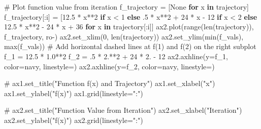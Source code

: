 \documentclass[
  russian,
  letterpaper,
  DIV=11,
  numbers=noendperiod]{scrartcl}
\newenvironment{Shaded}{\begin{snugshade}}{\end{snugshade}}
\newcommand{\BuiltInTok}[1]{\textcolor[rgb]{0.00,0.23,0.31}{#1}}
\newcommand{\CommentTok}[1]{\textcolor[rgb]{0.37,0.37,0.37}{#1}}
\newcommand{\ControlFlowTok}[1]{\textcolor[rgb]{0.00,0.23,0.31}{\textbf{#1}}}
\newcommand{\DecValTok}[1]{\textcolor[rgb]{0.68,0.00,0.00}{#1}}
\newcommand{\FloatTok}[1]{\textcolor[rgb]{0.68,0.00,0.00}{#1}}
\newcommand{\KeywordTok}[1]{\textcolor[rgb]{0.00,0.23,0.31}{\textbf{#1}}}
\newcommand{\NormalTok}[1]{\textcolor[rgb]{0.00,0.23,0.31}{#1}}
\newcommand{\OperatorTok}[1]{\textcolor[rgb]{0.37,0.37,0.37}{#1}}
\newcommand{\StringTok}[1]{\textcolor[rgb]{0.13,0.47,0.30}{#1}}
\newcommand{\VariableTok}[1]{\textcolor[rgb]{0.07,0.07,0.07}{#1}}
\begin{document}
\begin{enumerate}
\begin{enumerate}
\begin{Shaded}
\begin{Highlighting}[]
    \CommentTok{\# Plot function value from iteration}
\NormalTok{    f\_trajectory }\OperatorTok{=}\NormalTok{ [}\VariableTok{None} \ControlFlowTok{for}\NormalTok{ x }\KeywordTok{in}\NormalTok{ trajectory]}
\NormalTok{    f\_trajectory[:i] }\OperatorTok{=}\NormalTok{ [}\FloatTok{12.5} \OperatorTok{*}\NormalTok{ x}\OperatorTok{**}\DecValTok{2} \ControlFlowTok{if}\NormalTok{ x }\OperatorTok{\textless{}} \DecValTok{1} \ControlFlowTok{else} \FloatTok{.5} \OperatorTok{*}\NormalTok{ x}\OperatorTok{**}\DecValTok{2} \OperatorTok{+} \DecValTok{24} \OperatorTok{*}\NormalTok{ x }\OperatorTok{{-}} \DecValTok{12} \ControlFlowTok{if}\NormalTok{ x }\OperatorTok{\textless{}} \DecValTok{2} \ControlFlowTok{else} \FloatTok{12.5} \OperatorTok{*}\NormalTok{ x}\OperatorTok{**}\DecValTok{2} \OperatorTok{{-}} \DecValTok{24} \OperatorTok{*}\NormalTok{ x }\OperatorTok{+} \DecValTok{36} \ControlFlowTok{for}\NormalTok{ x }\KeywordTok{in}\NormalTok{ trajectory[:i]]}
\NormalTok{    ax2.plot(}\BuiltInTok{range}\NormalTok{(}\BuiltInTok{len}\NormalTok{(trajectory)), f\_trajectory, }\StringTok{\textquotesingle{}ro{-}\textquotesingle{}}\NormalTok{)}
\NormalTok{    ax2.set\_xlim(}\DecValTok{0}\NormalTok{, }\BuiltInTok{len}\NormalTok{(trajectory))}
\NormalTok{    ax2.set\_ylim(}\BuiltInTok{min}\NormalTok{(f\_vals), }\BuiltInTok{max}\NormalTok{(f\_vals))}
    \CommentTok{\# Add horizontal dashed lines at f(1) and f(2) on the right subplot}
\NormalTok{    f\_1 }\OperatorTok{=} \FloatTok{12.5} \OperatorTok{*} \FloatTok{1.0}\OperatorTok{**}\DecValTok{2}
\NormalTok{    f\_2 }\OperatorTok{=} \FloatTok{.5} \OperatorTok{*} \FloatTok{2.}\OperatorTok{**}\DecValTok{2} \OperatorTok{+} \DecValTok{24} \OperatorTok{*} \FloatTok{2.} \OperatorTok{{-}} \DecValTok{12}
\NormalTok{    ax2.axhline(y}\OperatorTok{=}\NormalTok{f\_1, color}\OperatorTok{=}\StringTok{\textquotesingle{}navy\textquotesingle{}}\NormalTok{, linestyle}\OperatorTok{=}\StringTok{\textquotesingle{}{-}{-}\textquotesingle{}}\NormalTok{)}
\NormalTok{    ax2.axhline(y}\OperatorTok{=}\NormalTok{f\_2, color}\OperatorTok{=}\StringTok{\textquotesingle{}navy\textquotesingle{}}\NormalTok{, linestyle}\OperatorTok{=}\StringTok{\textquotesingle{}{-}{-}\textquotesingle{}}\NormalTok{)}

    \CommentTok{\# ax1.set\_title("Function f(x) and Trajectory")}
\NormalTok{    ax1.set\_xlabel(}\StringTok{"x"}\NormalTok{)}
\NormalTok{    ax1.set\_ylabel(}\StringTok{"f(x)"}\NormalTok{)}
\NormalTok{    ax1.grid(linestyle}\OperatorTok{=}\StringTok{":"}\NormalTok{)}

    \CommentTok{\# ax2.set\_title("Function Value from Iteration")}
\NormalTok{    ax2.set\_xlabel(}\StringTok{"Iteration"}\NormalTok{)}
\NormalTok{    ax2.set\_ylabel(}\StringTok{"f(x)"}\NormalTok{)}
\NormalTok{    ax2.grid(linestyle}\OperatorTok{=}\StringTok{":"}\NormalTok{)}


\end{Highlighting}
\end{Shaded}
\end{enumerate}
\end{enumerate}
\end{document}
